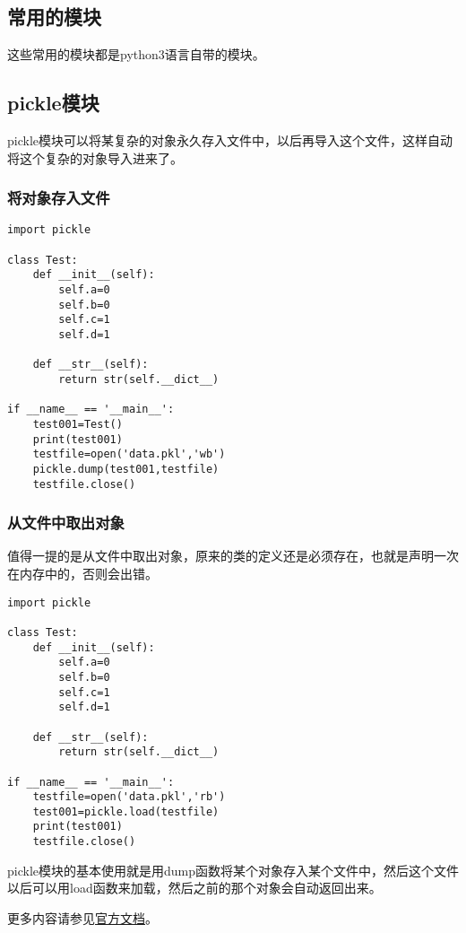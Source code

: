 \documentclass[12pt,oneside]{book}
\begin{document}
\begin{common-format}
\part{常用的模块}
这些常用的模块都是python3语言自带的模块。

\chapter{pickle模块}
\label{sec:pickle模块}
pickle模块可以将某复杂的对象永久存入文件中，以后再导入这个文件，这样自动将这个复杂的对象导入进来了。

\section{将对象存入文件}
\begin{Verbatim}
import pickle

class Test:
    def __init__(self):
        self.a=0
        self.b=0
        self.c=1
        self.d=1

    def __str__(self):
        return str(self.__dict__)

if __name__ == '__main__':
    test001=Test()
    print(test001)
    testfile=open('data.pkl','wb')
    pickle.dump(test001,testfile)
    testfile.close()
\end{Verbatim}




\section{从文件中取出对象}
值得一提的是从文件中取出对象，原来的类的定义还是必须存在，也就是声明一次在内存中的，否则会出错。
\begin{Verbatim}
import pickle

class Test:
    def __init__(self):
        self.a=0
        self.b=0
        self.c=1
        self.d=1

    def __str__(self):
        return str(self.__dict__)

if __name__ == '__main__':
    testfile=open('data.pkl','rb')
    test001=pickle.load(testfile)
    print(test001)
    testfile.close()
\end{Verbatim}

pickle模块的基本使用就是用dump函数将某个对象存入某个文件中，然后这个文件以后可以用load函数来加载，然后之前的那个对象会自动返回出来。

\begin{Large}
更多内容请参见\href{https://docs.python.org/3/library/pickle.html}{官方文档}。
\end{Large}


\end{common-format}
\end{document}
